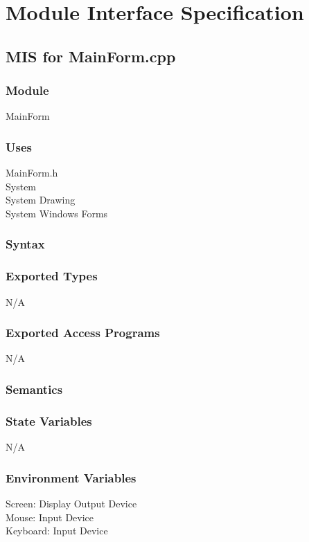 \documentclass{article}
\begin{document}
\newpage

\section{Module Interface Specification}

\subsection{MIS for MainForm.cpp}

\subsubsection* {Module}
MainForm

\subsubsection* {Uses}
MainForm.h \\
System \\
System Drawing \\
System Windows Forms

\subsubsection* {Syntax}
\subsubsection* {Exported Types}
N/A

\subsubsection* {Exported Access Programs}
N/A

\subsubsection* {Semantics}
\subsubsection* {State Variables}
N/A

\subsubsection* {Environment Variables}
Screen: Display Output Device \\
Mouse: Input Device \\
Keyboard: Input Device
\end{document}
